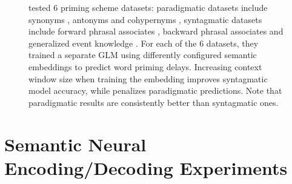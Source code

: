 \begin{figure}
    \centering
    \caption[Impact of Context Window Size on Syntagmatic and Paradigmatic Information Extraction]{\textcite{lapesaContrastingSyntagmaticParadigmatic2014} tested 6 priming scheme datasets: paradigmatic datasets include synonyms , antonyms  and cohypernyms , syntagmatic datasets include forward phrasal associates , backward phrasal associates  and generalized event knowledge . For each of the 6 datasets, they trained a separate GLM using differently configured semantic embeddings to predict word priming delays. Increasing context window size when training the embedding improves syntagmatic model accuracy, while penalizes paradigmatic predictions. Note that paradigmatic results are consistently better than syntagmatic ones.} 
    \label{fig:synparacontextwindow}
\end{figure}



\section{Semantic Neural Encoding/Decoding Experiments}

